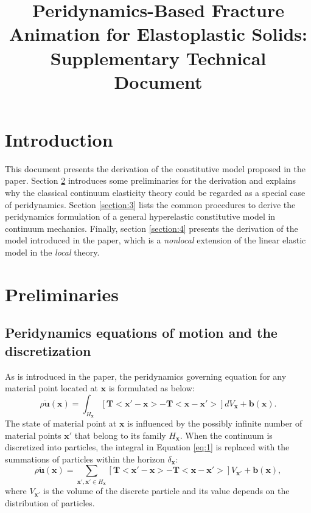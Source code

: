 \documentclass[11pt,fullpage]{article}
\title{Peridynamics-Based Fracture Animation for Elastoplastic Solids:\\
      Supplementary Technical Document}
\newcommand{\mb}[1]{\mathbf{#1}}
\newcommand{\blue}[1]{#1}
\begin{document}
\maketitle

\section{Introduction}

This document presents the derivation of the constitutive model proposed in the paper. Section \blue{\ref{section:2}} introduces some preliminaries for the derivation and explains why the classical continuum elasticity theory could be regarded as a special case of peridynamics. Section \blue{\ref{section:3}} lists the common procedures to derive the peridynamics formulation of a general hyperelastic constitutive model in continuum mechanics. Finally, section \blue{\ref{section:4}} presents the derivation of the model introduced in the paper, which is a \emph{nonlocal} extension of the linear elastic model in the \emph{local} theory.

\section{Preliminaries}\label{section:2}

\subsection{Peridynamics equations of motion and the discretization}

As is introduced in the paper, the peridynamics governing equation for any material point located at $\mb{x}$ is formulated as below:
\begin{equation}
\rho\ddot{\mb{u}}(\mb{x}) = \int_{H_\mb{x}}[\mb{T}<\mb{x}'-\mb{x}> - \mb{T}<\mb{x}-\mb{x}'>]dV_{\mb{x}}+\mb{b}(\mb{x}).
\label{eq:1}
\end{equation}
The state of material point at $\mb{x}$ is influenced by the possibly infinite number of material points $\mb{x}'$ that belong to its family $H_\mb{x}$. When the continuum is discretized into particles, the integral in Equation \blue{\ref{eq:1}} is replaced with the summations of particles within the horizon $\delta_\mb{x}$:
\begin{equation}
\rho\ddot{\mb{u}}(\mb{x}) = \sum_{\mb{x}',\mb{x}'\in H_\mb{x}}[\mb{T}<\mb{x}'-\mb{x}> - \mb{T}<\mb{x}-\mb{x}'>]V_{\mb{x}'}+\mb{b}(\mb{x}),
\label{eq:2}
\end{equation}
where $V_{\mb{x}'}$ is the volume of the discrete particle and its value depends on the distribution of particles.
\end{document}
